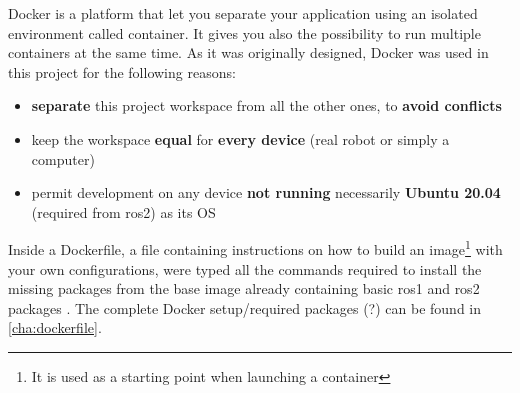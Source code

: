 Docker is a platform that let you separate your application using an isolated environment called container. It gives you also the possibility to run multiple containers at the same time. As it was originally designed, Docker was used in this project for the following reasons: %
  
\begin{itemize}
    \item \textbf{separate} this project workspace from all the other ones, to \textbf{avoid conflicts}
    \item keep the workspace \textbf{equal} for \textbf{every device} (real robot or simply a computer)
    \item permit development on any device \textbf{not running} necessarily \textbf{Ubuntu 20.04} (required from \acrshort{ros}2) as its OS
\end{itemize}  
  
Inside a Dockerfile, a file containing instructions on how to build an image\footnote{It is used as a starting point when launching a container} with your own configurations, were typed all the commands required to install the missing packages from the base image already containing basic \acrshort{ros}1 and \acrshort{ros}2 packages \cite{dockerimage}. The complete Docker setup/required packages (?) can be found in \autoref{cha:dockerfile}.